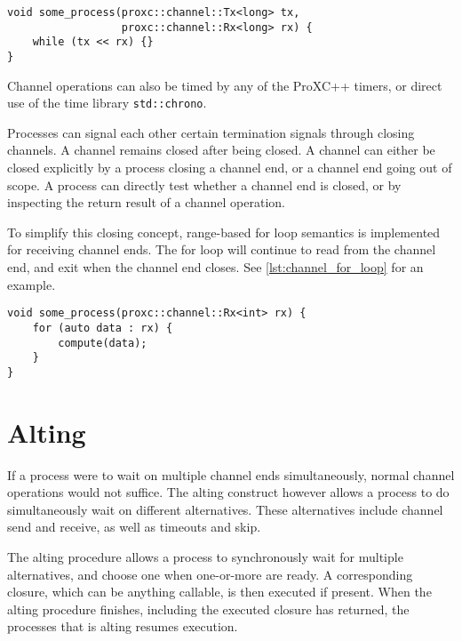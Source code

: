 \begin{lstfloat}
\begin{lstlisting}[caption={Channel end piping.}, label={lst:channel_end_piping}, style={CustomC++}]
void some_process(proxc::channel::Tx<long> tx,
                  proxc::channel::Rx<long> rx) {
    while (tx << rx) {}
}
\end{lstlisting}
\end{lstfloat}

Channel operations can also be timed by any of the ProXC++ timers, or direct use of the time library \lstinline[style={CustomC++}]|std::chrono|. 

Processes can signal each other certain termination signals through closing channels. A channel remains closed after being closed. A channel can either be closed explicitly by a process closing a channel end, or a channel end going out of scope. A process can directly test whether a channel end is closed, or by inspecting the return result of a channel operation.

To simplify this closing concept, range\hyp{}based for loop semantics is implemented for receiving channel ends. The for loop will continue to read from the channel end, and exit when the channel end closes. See \cref{lst:channel_for_loop} for an example.

\begin{lstfloat}
\begin{lstlisting}[caption={Range\hyp{}based for loop semantics for receiving channel ends.}, label={lst:channel_for_loop}, style={CustomC++}]
void some_process(proxc::channel::Rx<int> rx) {
    for (auto data : rx) {
        compute(data);
    }
}
\end{lstlisting}
\end{lstfloat}


\section{Alting}


If a process were to wait on multiple channel ends simultaneously, normal channel operations would not suffice. The alting construct however allows a process to do simultaneously wait on different alternatives. These alternatives include channel send and receive, as well as timeouts and skip.

The alting procedure allows a process to synchronously wait for multiple alternatives, and choose one when one\hyp{}or\hyp{}more are ready. A corresponding closure, which can be anything callable, is then executed if present. When the alting procedure finishes, including the executed closure has returned, the processes that is alting resumes execution.

